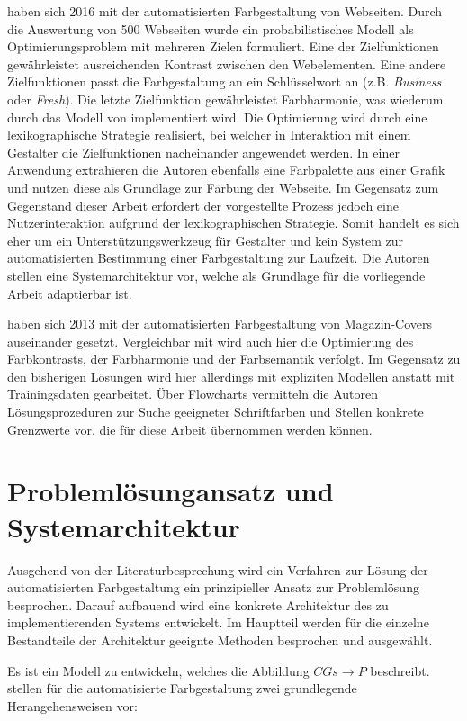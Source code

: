 \documentclass[10pt,a4paper,bibliography=totoc,twocolumn]{scrartcl}
\begin{document}
\citet{webpage} haben sich 2016 mit der automatisierten Farbgestaltung von Webseiten. Durch die Auswertung von 500 Webseiten wurde ein probabilistisches Modell als Optimierungsproblem mit mehreren Zielen formuliert. Eine der Zielfunktionen gewährleistet ausreichenden Kontrast zwischen den Webelementen. Eine andere Zielfunktionen passt die Farbgestaltung an ein Schlüsselwort an (z.B. \emph{Business} oder \emph{Fresh}). Die letzte Zielfunktion gewährleistet Farbharmonie, was wiederum durch das Modell von \citet{colorcomp} implementiert wird. Die Optimierung wird durch eine lexikographische Strategie realisiert, bei welcher in Interaktion mit einem Gestalter die Zielfunktionen nacheinander angewendet werden. In einer Anwendung extrahieren die Autoren ebenfalls eine Farbpalette aus einer Grafik und nutzen diese als Grundlage zur Färbung der Webseite. Im Gegensatz zum Gegenstand dieser Arbeit erfordert der vorgestellte Prozess jedoch eine Nutzerinteraktion aufgrund der lexikographischen Strategie. Somit handelt es sich eher um ein Unterstützungswerkzeug für Gestalter und kein System zur automatisierten Bestimmung einer Farbgestaltung zur Laufzeit. Die Autoren stellen eine Systemarchitektur vor, welche als Grundlage für die vorliegende Arbeit adaptierbar ist.

\citet{magazines}  haben sich 2013 mit der automatisierten Farbgestaltung von Magazin-Covers auseinander gesetzt. Vergleichbar mit \citep{webpage} wird auch hier die Optimierung des Farbkontrasts, der Farbharmonie und der Farbsemantik verfolgt.  Im Gegensatz zu den bisherigen Lösungen wird hier allerdings mit expliziten Modellen anstatt mit Trainingsdaten gearbeitet. Über Flowcharts vermitteln die Autoren Lösungsprozeduren zur Suche geeigneter Schriftfarben und Stellen konkrete Grenzwerte vor, die für diese Arbeit übernommen werden können.

\section{Problemlösungansatz und Systemarchitektur}

Ausgehend von der Literaturbesprechung wird ein Verfahren zur Lösung der automatisierten Farbgestaltung ein prinzipieller Ansatz zur Problemlösung besprochen. Darauf aufbauend wird eine konkrete Architektur des zu implementierenden Systems entwickelt. Im Hauptteil werden für die einzelne Bestandteile der Architektur geeignte Methoden besprochen und ausgewählt.

Es ist ein Modell zu entwickeln, welches die Abbildung $CGs \to P$ beschreibt. \citet{webpage} stellen für die automatisierte Farbgestaltung zwei grundlegende Herangehensweisen vor:
\end{document}
